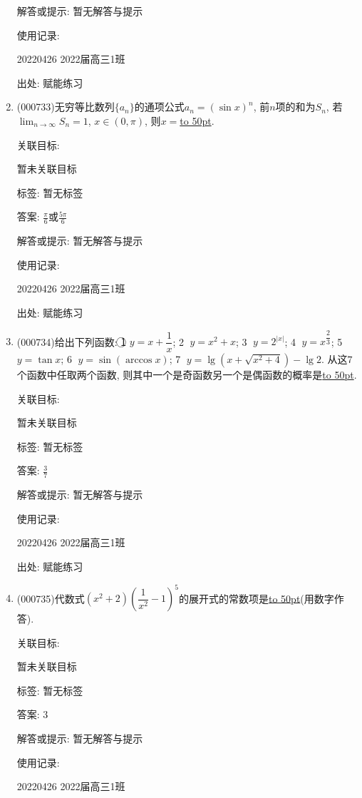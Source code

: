 \documentclass[10pt,a4paper]{article}
\newcommand{\blank}[1]{\underline{\hbox to #1pt{}}}
\begin{document}
\begin{enumerate}[1.]
解答或提示: 暂无解答与提示

使用记录:

20220426	2022届高三1班	


出处: 赋能练习
\item { (000733)}无穷等比数列$\{a_n\}$的通项公式$a_n=(\sin x)^n$, 前$n$项的和为$S_n$, 若$\displaystyle\lim_{n\to\infty}S_n=1$, $x\in (0,\pi)$, 则$x=$\blank{50}.


关联目标:

暂未关联目标



标签: 暂无标签

答案: $\frac{\pi}6$或$\frac{5\pi}6$

解答或提示: 暂无解答与提示

使用记录:

20220426	2022届高三1班	


出处: 赋能练习
\item { (000734)}给出下列函数: \textcircled{1} $y=x+\dfrac1x$; \textcircled{2} $y={x^2}+x$; \textcircled{3} $y={2^{|x|}}$; \textcircled{4} $y={x^{\dfrac23}}$; \textcircled{5} $y=\tan x$; \textcircled{6} $y=\sin(\arccos x)$; \textcircled{7} $y=\lg(x+\sqrt{{x^2}+4})-\lg 2$. 从这$7$个函数中任取两个函数, 则其中一个是奇函数另一个是偶函数的概率是\blank{50}.


关联目标:

暂未关联目标



标签: 暂无标签

答案: $\frac 37$

解答或提示: 暂无解答与提示

使用记录:

20220426	2022届高三1班	


出处: 赋能练习
\item { (000735)}代数式$(x^2+2)(\dfrac1{x^2}-1)^5$的展开式的常数项是\blank{50}(用数字作答).


关联目标:

暂未关联目标



标签: 暂无标签

答案: $3$

解答或提示: 暂无解答与提示

使用记录:

20220426	2022届高三1班	



\end{enumerate}
\end{document}
